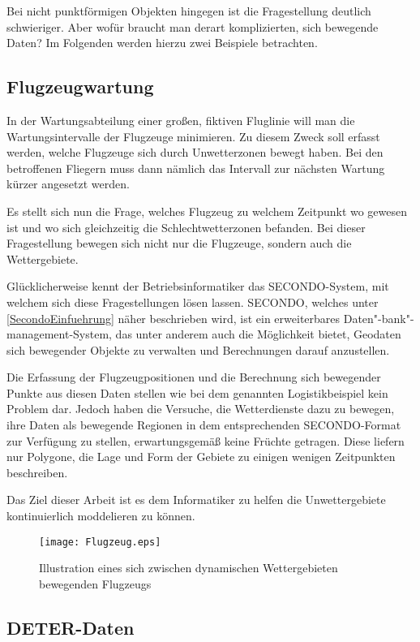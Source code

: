 Bei nicht punktförmigen Objekten hingegen ist die Fragestellung deutlich schwieriger. Aber wofür braucht man derart komplizierten, sich bewegende Daten? Im Folgenden werden hierzu zwei Beispiele betrachten.

\subsection*{Flugzeugwartung}

In der Wartungsabteilung einer großen, fiktiven Fluglinie will man die Wartungsintervalle der Flugzeuge minimieren. Zu diesem Zweck soll erfasst werden, welche Flugzeuge sich durch Unwetterzonen bewegt haben. Bei den betroffenen Fliegern muss dann nämlich das Intervall zur nächsten Wartung kürzer angesetzt werden. 

Es stellt sich nun die Frage, welches Flugzeug zu welchem Zeitpunkt wo gewesen ist und wo sich gleichzeitig die Schlechtwetterzonen befanden. Bei dieser Fragestellung bewegen sich nicht nur die Flugzeuge, sondern auch die Wettergebiete.

Glücklicherweise kennt der Betriebsinformatiker das SECONDO-System, mit welchem sich diese Fragestellungen lösen lassen. SECONDO, welches unter \vref{SecondoEinfuehrung} näher beschrieben wird, ist ein erweiterbares Daten"-bank"-management-System, das unter anderem auch die Möglichkeit bietet, Geodaten sich bewegender Objekte zu verwalten und Berechnungen darauf anzustellen.

Die Erfassung der Flugzeugpositionen und die Berechnung sich bewegender Punkte aus diesen Daten stellen wie bei dem genannten Logistikbeispiel kein Problem dar. Jedoch haben die Versuche, die Wetterdienste dazu zu bewegen, ihre Daten als bewegende Regionen in dem entsprechenden SECONDO-Format zur Verfügung zu stellen, erwartungsgemäß keine Früchte getragen. Diese liefern nur  Polygone, die Lage und Form der Gebiete zu einigen wenigen Zeitpunkten beschreiben.

Das Ziel dieser Arbeit ist es dem  Informatiker zu helfen die Unwettergebiete kontinuierlich moddelieren zu können.

\begin{figure}
	\centering
	\texttt{[image: Flugzeug.eps]}
	\caption[Flugzeug zwischen Wettergebieten]{Illustration eines sich zwischen dynamischen Wettergebieten bewegenden Flugzeugs}
	\label{fig:Flugzeug}
\end{figure}


\subsection*{DETER-Daten}

